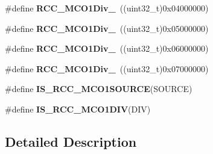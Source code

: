 \begin{DoxyCompactItemize}
\item 
\hypertarget{group___r_c_c___m_c_o1___clock___source___prescaler_gab0247962772ebf1735b7b2a84c235415}{\#define {\bfseries R\-C\-C\-\_\-\-M\-C\-O1\-Div\-\_}~((uint32\-\_\-t)0x04000000)}\label{group___r_c_c___m_c_o1___clock___source___prescaler_gab0247962772ebf1735b7b2a84c235415}

\item 
\hypertarget{group___r_c_c___m_c_o1___clock___source___prescaler_ga298d00af4cd40822e28a5a20d6cdbfb6}{\#define {\bfseries R\-C\-C\-\_\-\-M\-C\-O1\-Div\-\_}~((uint32\-\_\-t)0x05000000)}\label{group___r_c_c___m_c_o1___clock___source___prescaler_ga298d00af4cd40822e28a5a20d6cdbfb6}

\item 
\hypertarget{group___r_c_c___m_c_o1___clock___source___prescaler_ga2300f224151c8e15424142ee4fc5f549}{\#define {\bfseries R\-C\-C\-\_\-\-M\-C\-O1\-Div\-\_}~((uint32\-\_\-t)0x06000000)}\label{group___r_c_c___m_c_o1___clock___source___prescaler_ga2300f224151c8e15424142ee4fc5f549}

\item 
\hypertarget{group___r_c_c___m_c_o1___clock___source___prescaler_ga756a1097bf0e4fe15d72f113572d0c04}{\#define {\bfseries R\-C\-C\-\_\-\-M\-C\-O1\-Div\-\_}~((uint32\-\_\-t)0x07000000)}\label{group___r_c_c___m_c_o1___clock___source___prescaler_ga756a1097bf0e4fe15d72f113572d0c04}

\item 
\#define {\bfseries I\-S\-\_\-\-R\-C\-C\-\_\-\-M\-C\-O1\-S\-O\-U\-R\-C\-E}(S\-O\-U\-R\-C\-E)
\item 
\#define {\bfseries I\-S\-\_\-\-R\-C\-C\-\_\-\-M\-C\-O1\-D\-I\-V}(D\-I\-V)
\end{DoxyCompactItemize}


\subsection{Detailed Description}


